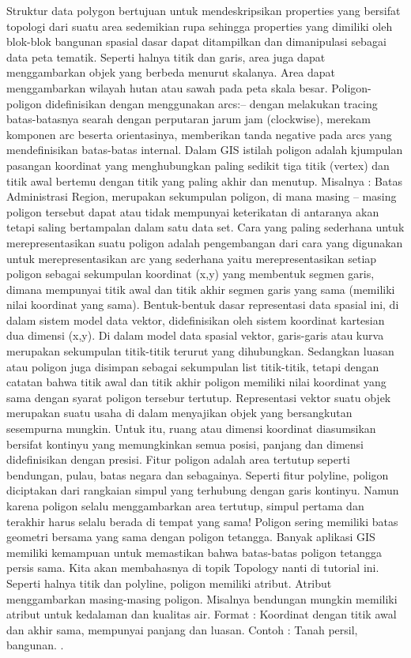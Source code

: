Struktur data polygon bertujuan untuk mendeskripsikan properties yang bersifat topologi dari suatu area sedemikian rupa sehingga properties yang dimiliki oleh blok-blok bangunan spasial dasar dapat ditampilkan dan dimanipulasi sebagai data peta tematik. Seperti halnya titik dan garis, area juga dapat menggambarkan objek yang berbeda menurut skalanya. Area dapat menggambarkan wilayah hutan atau sawah pada peta skala besar.  Poligon-poligon didefinisikan dengan menggunakan arcs:-- dengan melakukan tracing batas-batasnya searah dengan perputaran jarum jam (clockwise), merekam komponen arc beserta orientasinya, memberikan tanda negative pada arcs yang mendefinisikan batas-batas internal.  
Dalam GIS istilah poligon adalah kjumpulan pasangan koordinat yang menghubungkan paling sedikit tiga titik (vertex) dan titik awal bertemu dengan titik yang paling akhir dan menutup. Misalnya : Batas Administrasi
Region, merupakan sekumpulan poligon, di mana masing – masing poligon tersebut dapat atau tidak mempunyai keterikatan di antaranya akan tetapi saling bertampalan dalam satu data set.
Cara yang paling sederhana untuk merepresentasikan suatu poligon adalah pengembangan dari cara yang digunakan untuk merepresentasikan arc yang sederhana yaitu merepresentasikan setiap poligon sebagai sekumpulan koordinat (x,y) yang membentuk segmen garis, dimana mempunyai titik awal dan titik akhir segmen garis yang sama (memiliki nilai koordinat yang sama). Bentuk-bentuk dasar representasi data spasial ini, di dalam sistem model data vektor, didefinisikan oleh sistem koordinat kartesian dua dimensi (x,y). Di dalam model data spasial vektor, garis-garis atau kurva merupakan sekumpulan titik-titik terurut yang dihubungkan. Sedangkan luasan atau poligon juga disimpan sebagai sekumpulan list titik-titik, tetapi dengan catatan bahwa titik awal dan titik akhir poligon memiliki nilai koordinat yang sama dengan syarat poligon tersebur tertutup. Representasi vektor suatu objek merupakan suatu usaha di dalam menyajikan objek yang bersangkutan sesempurna mungkin. Untuk itu, ruang atau dimensi koordinat diasumsikan bersifat kontinyu yang memungkinkan semua posisi, panjang dan dimensi didefinisikan dengan presisi.
Fitur poligon adalah area tertutup seperti bendungan, pulau, batas negara dan sebagainya. Seperti fitur polyline, poligon diciptakan dari rangkaian simpul yang terhubung dengan garis kontinyu. Namun karena poligon selalu menggambarkan area tertutup, simpul pertama dan terakhir harus selalu berada di tempat yang sama! Poligon sering memiliki batas geometri bersama yang sama dengan poligon tetangga. Banyak aplikasi GIS memiliki kemampuan untuk memastikan bahwa batas-batas poligon tetangga persis sama. Kita akan membahasnya di topik Topology nanti di tutorial ini. Seperti halnya titik dan polyline, poligon memiliki atribut. Atribut menggambarkan masing-masing poligon. Misalnya bendungan mungkin memiliki atribut untuk kedalaman dan kualitas air. Format : Koordinat dengan titik awal dan akhir sama, mempunyai panjang dan luasan. Contoh : Tanah persil, bangunan. \cite{mahendra2014sistem}.